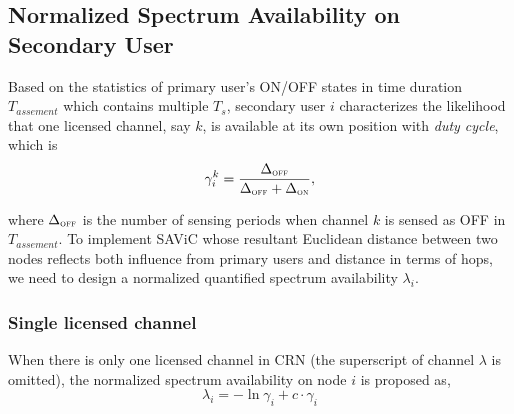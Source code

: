 




\subsection{Normalized Spectrum Availability on Secondary User}\label{CA_VC_likelihood}
Based on the statistics of primary user's ON/OFF states in time duration $T_{assement}$ which contains multiple $T_s$, secondary user $i$ characterizes the likelihood that one licensed channel, say $k$, is available at its own position with \textit{duty cycle}, which is
\begin{equation}
\label{gamma}
\gamma_i^k = \frac{\Delta_{\textsc{\tiny OFF}}}{\Delta_{\textsc{\tiny OFF}}+\Delta_{\textsc{\tiny ON}}},
\end{equation}

where $\Delta_{\textsc{\tiny OFF}}$ is the number of sensing periods when channel $k$ is sensed as OFF in $T_{assement}$.
To implement SAViC whose resultant Euclidean distance between two nodes reflects both influence from primary users and distance in terms of hops, we need to design a normalized quantified spectrum availability $\lambda_i$.

\subsubsection*{Single licensed channel}
When there is only one licensed channel in CRN (the superscript of channel $\lambda$ is omitted), the normalized spectrum availability on node $i$ is proposed as,%
\begin{equation}
\lambda_i = -\ln \gamma_i+ c \cdot \gamma_i
\label{singCH_onehop_dc_metric}
\end{equation}

